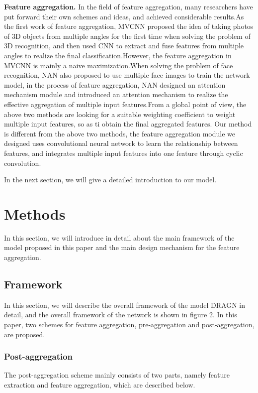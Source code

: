 \documentclass[10pt,twocolumn,letterpaper]{article}
\begin{document}
\textbf{Feature aggregation.} In the field of feature aggregation, many researchers have put forward their own schemes and ideas, and achieved considerable results.As the first work of feature aggregation, MVCNN\cite{ref23} proposed the idea of taking photos of 3D objects from multiple angles for the first time when solving the problem of 3D recognition, and then used CNN to extract and fuse features from multiple angles to realize the final classification.However, the feature aggregation in MVCNN is mainly a naive maximization.When solving the problem of face recognition, NAN\cite{ref24} also proposed to use multiple face images to train the network model, in the process of feature aggregation, NAN designed an attention mechanism module and introduced an attention mechanism to realize the effective aggregation of multiple input features.From a global point of view, the above two methods are looking for a suitable weighting coefficient to weight multiple input features, so as ti obtain the final aggregated features. Our method is different from the above two methods, the feature aggregation module we designed uses convolutional neural network to learn the relationship between features, and integrates multiple input features into one feature through cyclic convolution.

In the next section, we will give a detailed introduction to our model.

\section{Methods}
In this section, we will introduce in detail about the main framework of the model proposed in this paper and the main design mechanism for the feature aggregation.

\subsection{Framework}
In this section, we will describe the overall framework of the model DRAGN in detail, and the overall framework of the network is shown in figure 2. In this paper, two schemes for feature aggregation, pre-aggregation and post-aggregation, are proposed.

\subsubsection{Post-aggregation}
The post-aggregation scheme mainly consists of two parts, namely feature extraction and feature aggregation, which are described below.
\end{document}
